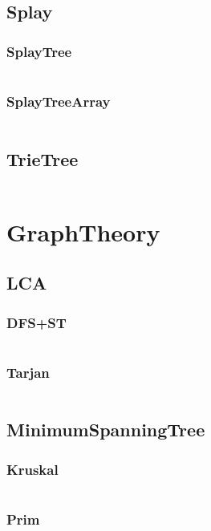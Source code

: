 \documentclass[a4paper,11pt]{article}
\begin{document}
\subsection{Splay}
\subsubsection{SplayTree}
\inputminted[breaklines]{c++}{M/我的模板/03++DataStructure/+Splay/+SplayTree.cpp}
\subsubsection{SplayTreeArray}
\inputminted[breaklines]{c++}{M/我的模板/03++DataStructure/+Splay/+SplayTreeArray.cpp}

\subsection{TrieTree}
\inputminted[breaklines]{c++}{M/我的模板/03++DataStructure/+TrieTree.cpp}

\newpage
\section{GraphTheory}
\subsection{LCA}
\subsubsection{DFS+ST}
\inputminted[breaklines]{c++}{M/我的模板/04++GraphTheory/+LCA/+DFS+ST.cpp}
\subsubsection{Tarjan}
\inputminted[breaklines]{c++}{M/我的模板/04++GraphTheory/+LCA/+Tarjan.cpp}

\subsection{MinimumSpanningTree}
\subsubsection{Kruskal}
\inputminted[breaklines]{c++}{M/我的模板/04++GraphTheory/+MinimumSpanningTree/+Kruskal.cpp}
\subsubsection{Prim}
\inputminted[breaklines]{c++}{M/我的模板/04++GraphTheory/+MinimumSpanningTree/+Prim.cpp}
\end{document}
